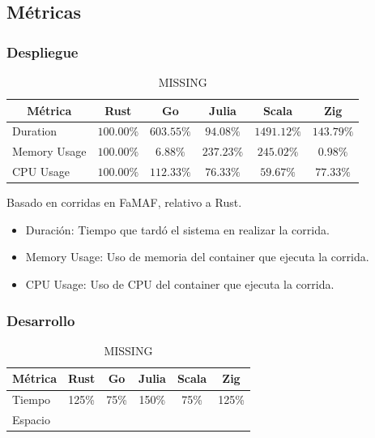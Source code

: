 \documentclass[11pt]{article}
\let\Oldsubsection\subsection
\renewcommand{\subsection}{\FloatBarrier\Oldsubsection}
\let\Oldsubsubsection\subsubsection
\renewcommand{\subsubsection}{\FloatBarrier\Oldsubsubsection}
\begin{document}
\subsection{Métricas}

\subsubsection{Despliegue}

\begin{table}[h]
\centering
\begin{tabular}{|l|c|c|c|c|c|}
\hline
\multicolumn{1}{|c|}{Métrica} & Rust & Go & Julia & Scala & Zig \\ \hline
Duration & $100.00\%$& $603.55\%$& $94.08\%$& $1491.12\%$& $143.79\%$\\ \hline
Memory Usage & $100.00\%$& $6.88\%$& $237.23\%$& $245.02\%$& $0.98\%$\\ \hline
CPU Usage & $100.00\%$& $112.33\%$& $76.33\%$& $59.67\%$& $77.33\%$\\ \hline
\end{tabular}
\caption{MISSING} %
\end{table}

Basado en corridas en FaMAF, relativo a Rust. %

\begin{itemize}
    \item Duración: Tiempo que tardó el sistema en realizar la corrida.
    \item Memory Usage: Uso de memoria del container que ejecuta la corrida.
    \item CPU Usage: Uso de CPU del container que ejecuta la corrida.
\end{itemize}

\subsubsection{Desarrollo}

\begin{table}[h]
\centering
\begin{tabular}{|l|c|c|c|c|c|}
\hline
\multicolumn{1}{|c|}{Métrica} & Rust & Go & Julia & Scala & Zig \\ \hline
Tiempo & 125\% & 75\% & 150\% & 75\% & 125\% \\ \hline
Espacio &  &  &  &  &  \\ \hline
\end{tabular}
\caption{MISSING} %
\end{table}
\end{document}
